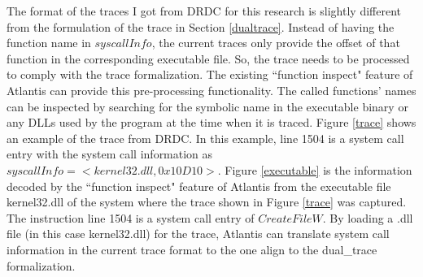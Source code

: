 \documentclass[12pt,oneside]{book}
\begin{document}
The format of the traces I got from DRDC for this research is slightly different from the formulation of the trace in Section \ref{dualtrace}. Instead of having the function name in $syscallInfo$, the current traces only provide the offset of that function in the corresponding executable file. So, the trace needs to be processed to comply with the trace formalization.
The existing ``function inspect" feature of Atlantis can provide this pre-processing functionality. The called functions' names can be inspected by searching for the symbolic name in the executable binary or any DLLs used by the program at the time when it is traced. Figure \ref{trace} shows an example of the trace from DRDC. In this example, line 1504 is a system call entry with the system call information as $syscallInfo = <kernel32.dll, 0x10D10>$. 
Figure \ref{executable} is the information decoded by the ``function inspect" feature of Atlantis from the executable file kernel32.dll of the system where the trace shown in Figure \ref{trace} was captured. The instruction line 1504 is a system call entry of $CreateFileW$. By loading a .dll file (in this case kernel32.dll) for the trace, Atlantis can translate system call information in the current trace format to the one align to the dual\_trace formalization.
\end{document}
